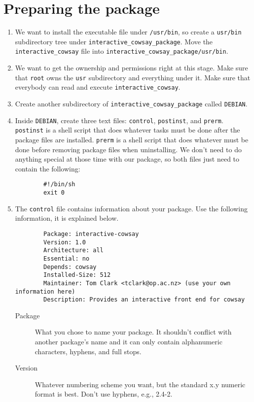 \documentclass{article}
\begin{document}
\section{Preparing the package}
\begin{enumerate}
	\item We want to install the executable file under \texttt{/usr/bin}, so create a \texttt{usr/bin} subdirectory tree under
		\texttt{interactive\_cowsay\_package}. Move the \texttt{interactive\_cowsay} file into \texttt{interactive\_cowsay\_package/usr/bin}.
	\item We want to get the ownership and permissions right at this stage. Make sure that \texttt{root} owns the \texttt{usr}
		subdirectory and everything under it. Make sure that everybody can read and execute \texttt{interactive\_cowsay}.
	\item Create another subdirectory of \texttt{interactive\_cowsay\_package} called \texttt{DEBIAN}.
	\item Inside \texttt{DEBIAN}, create three text files: \texttt{control}, \texttt{postinst}, and \texttt{prerm}.
		\texttt{postinst} is a shell script that does whatever tasks must be done after the package files are installed.
		\texttt{prerm} is a shell script that does whatever must be done before removing package files when uninstalling.
		We don't need to do anything special at those time with our package, so both files just need to contain the following:

		\begin{verbatim}
		#!/bin/sh
		exit 0
		\end{verbatim}


	\item The \texttt{control} file contains information about your package. Use the following information, it is explained below.
		\begin{verbatim}
		Package: interactive-cowsay
		Version: 1.0
		Architecture: all
		Essential: no
		Depends: cowsay
		Installed-Size: 512
		Maintainer: Tom Clark <tclark@op.ac.nz> (use your own information here)
		Description: Provides an interactive front end for cowsay
		\end{verbatim}

		\begin{description}
			\item[Package]What you chose to name your package. It shouldn't conflict with another package's name and it can only contain alphanumeric characters, hyphens, and full stops.
                        \item[Version]Whatever numbering scheme you want, but the standard x.y numeric format is best. Don't use hyphens, e.g., 2.4-2.


\end{description}
\end{enumerate}
\end{document}
